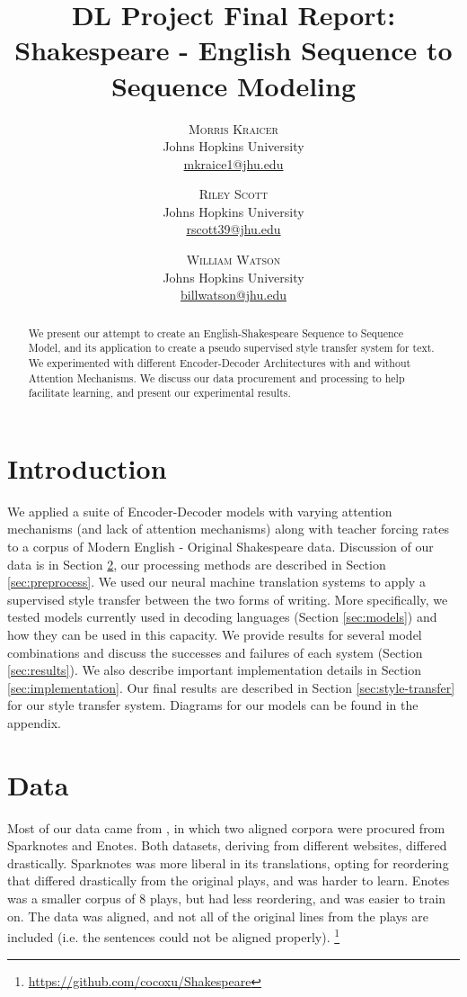\documentclass[twoside,twocolumn]{article}
\title{DL Project Final Report:\\
       Shakespeare - English Sequence to Sequence Modeling}
\author{%
\textsc{Morris Kraicer} \\[1ex]
\normalsize Johns Hopkins University \\
\normalsize \href{mailto:mkraice1@jhu.edu}{mkraice1@jhu.edu}
 \and
 \textsc{Riley Scott} \\[1ex]
\normalsize Johns Hopkins University \\
\normalsize \href{mailto:rscott39@jhu.edu}{rscott39@jhu.edu}
 \and
  \textsc{William Watson} \\[1ex]
\normalsize Johns Hopkins University \\
\normalsize \href{mailto:billwatson@jhu.edu}{billwatson@jhu.edu}
}
\date{}%
\begin{document}
\maketitle



\begin{abstract}
\noindent
We present our attempt to create an English-Shakespeare Sequence to Sequence
Model, and its application to create a pseudo supervised style transfer system
for text. We experimented with different Encoder-Decoder Architectures with and
without Attention Mechanisms. We discuss our data procurement and processing
to help facilitate learning, and present our experimental results.
\end{abstract}

\section{Introduction}
We applied a suite of Encoder-Decoder models with varying attention
mechanisms (and lack of attention mechanisms) along with teacher forcing rates
to a corpus of Modern English - Original Shakespeare data. Discussion of our
data is in Section \ref{sec:data},
our processing methods are described in Section \ref{sec:preprocess}.
We used our neural machine translation systems to
apply a supervised style transfer between the two forms of writing.
More specifically, we tested models currently
used in decoding languages (Section \ref{sec:models}) and how they can
be used in this capacity. We provide results for several model
combinations and discuss the successes and failures of each system
(Section \ref{sec:results}). We also describe important implementation details
in Section \ref{sec:implementation}. Our final results are described in
Section \ref{sec:style-transfer} for our style transfer system.
Diagrams for our models can be found in the appendix.
\section{Data}
\label{sec:data}
Most of our data came from \cite{xu2012paraphrasing}, in which
two aligned corpora were procured from Sparknotes and Enotes. Both datasets,
deriving from different websites, differed drastically. Sparknotes was more
liberal in its translations, opting for reordering that differed drastically
from the original plays, and was harder to learn. Enotes was a smaller corpus
of 8 plays, but had less reordering, and was easier to train on.
The data was aligned, and not all of the original lines
from the plays are included (i.e. the sentences could not be aligned properly).
\footnote{\url{https://github.com/cocoxu/Shakespeare}}
\end{document}
